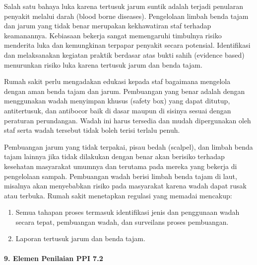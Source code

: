 \documentclass[
]{book}
\providecommand{\tightlist}{%
  \setlength{\itemsep}{0pt}\setlength{\parskip}{0pt}}
\begin{document}
Salah satu bahaya luka karena tertusuk jarum suntik adalah terjadi penularan penyakit melalui darah (blood borne diseases). Pengelolaan limbah benda tajam dan jarum yang tidak benar merupakan kekhawatiran staf terhadap keamanannya. Kebiasaan bekerja sangat memengaruhi timbulnya risiko menderita luka dan kemungkinan terpapar penyakit secara potensial. Identifikasi dan melaksanakan kegiatan praktik berdasar atas bukti sahih (evidence based) menurunkan risiko luka karena tertusuk jarum dan benda tajam.

Rumah sakit perlu mengadakan edukasi kepada staf bagaimana mengelola dengan aman benda tajam dan jarum. Pembuangan yang benar adalah dengan menggunakan wadah menyimpan khusus (safety box) yang dapat ditutup, antitertusuk, dan antibocor baik di dasar maupun di sisinya sesuai dengan peraturan perundangan. Wadah ini harus tersedia dan mudah dipergunakan oleh staf serta wadah tersebut tidak boleh terisi terlalu penuh.

Pembuangan jarum yang tidak terpakai, pisau bedah (scalpel), dan limbah benda tajam lainnya jika tidak dilakukan dengan benar akan berisiko terhadap kesehatan masyarakat umumnya dan terutama pada mereka yang bekerja di pengelolaan sampah. Pembuangan wadah berisi limbah benda tajam di laut, misalnya akan menyebabkan risiko pada masyarakat karena wadah dapat rusak atau terbuka. Rumah sakit menetapkan regulasi yang memadai mencakup:

\begin{enumerate}
\def\labelenumi{\alph{enumi}.}
\tightlist
\item
  Semua tahapan proses termasuk identifikasi jenis dan penggunaan wadah secara tepat, pembuangan wadah, dan surveilans proses pembuangan.
\item
  Laporan tertusuk jarum dan benda tajam.
\end{enumerate}

\hypertarget{elemen-penilaian-ppi-7.2}{%
\paragraph*{9. Elemen Penilaian PPI 7.2}\label{elemen-penilaian-ppi-7.2}}
\end{document}
